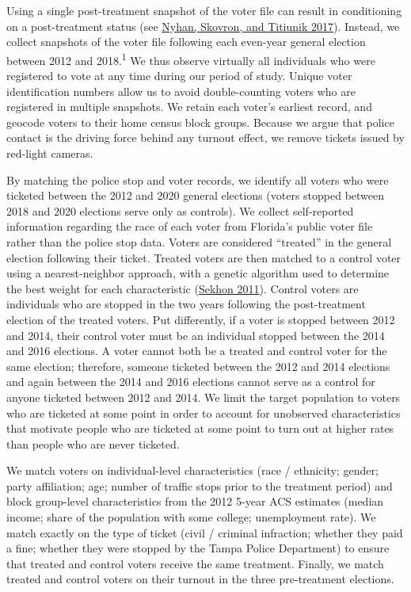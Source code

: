 \documentclass[
  12pt,
]{article}
\begin{document}
Using a single post-treatment snapshot of the voter file can result in conditioning on a post-treatment status (see \protect\hyperlink{ref-Nyhan2017}{Nyhan, Skovron, and Titiunik 2017}). Instead, we collect snapshots of the voter file following each even-year general election between 2012 and 2018.\textsuperscript{1} We thus observe virtually all individuals who were registered to vote at any time during our period of study. Unique voter identification numbers allow us to avoid double-counting voters who are registered in multiple snapshots. We retain each voter's earliest record, and geocode voters to their home census block groups. Because we argue that police contact is the driving force behind any turnout effect, we remove tickets issued by red-light cameras.

By matching the police stop and voter records, we identify all voters who were ticketed between the 2012 and 2020 general elections (voters stopped between 2018 and 2020 elections serve only as controls). We collect self-reported information regarding the race of each voter from Florida's public voter file rather than the police stop data. Voters are considered ``treated'' in the general election following their ticket. Treated voters are then matched to a control voter using a nearest-neighbor approach, with a genetic algorithm used to determine the best weight for each characteristic (\protect\hyperlink{ref-Sekhon2011}{Sekhon 2011}). Control voters are individuals who are stopped in the two years following the post-treatment election of the treated voters. Put differently, if a voter is stopped between 2012 and 2014, their control voter must be an individual stopped between the 2014 and 2016 elections. A voter cannot both be a treated and control voter for the same election; therefore, someone ticketed between the 2012 and 2014 elections and again between the 2014 and 2016 elections cannot serve as a control for anyone ticketed between 2012 and 2014. We limit the target population to voters who are ticketed at some point in order to account for unobserved characteristics that motivate people who are ticketed at some point to turn out at higher rates than people who are never ticketed.

We match voters on individual-level characteristics (race / ethnicity; gender; party affiliation; age; number of traffic stops prior to the treatment period) and block group-level characteristics from the 2012 5-year ACS estimates (median income; share of the population with some college; unemployment rate). We match exactly on the type of ticket (civil / criminal infraction; whether they paid a fine; whether they were stopped by the Tampa Police Department) to ensure that treated and control voters receive the same treatment. Finally, we match treated and control voters on their turnout in the three pre-treatment elections.
\end{document}
